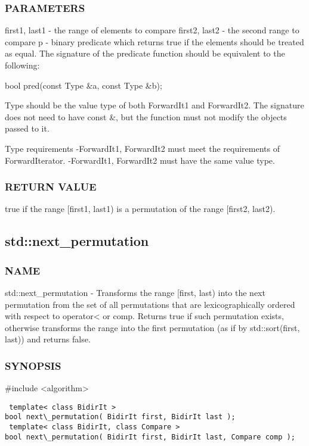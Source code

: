 \subsubsection{PARAMETERS}
first1, last1 - the range of elements to compare
first2, last2 - the second range to compare
p - binary predicate which returns true if the elements should be treated as equal.
The signature of the predicate function should be equivalent to the following:

 bool pred(const Type \&a, const Type \&b);

Type should be the value type of both ForwardIt1 and ForwardIt2. The signature does not need to have const \&, but the function must not modify the objects passed to it.

 Type requirements
 -ForwardIt1, ForwardIt2 must meet the requirements of ForwardIterator.
 -ForwardIt1, ForwardIt2 must have the same value type.

\subsubsection{RETURN VALUE}
true if the range [first1, last1) is a permutation of the range [first2, last2).



\subsection{std::next\_permutation}

\subsubsection{NAME}
std::next\_permutation - Transforms the range [first, last) into the next permutation from the set of all permutations that are lexicographically ordered with respect to operator< or comp. Returns true if such permutation exists, otherwise transforms the range into the first permutation (as if by std::sort(first, last)) and returns false.

\subsubsection{SYNOPSIS}
\#include <algorithm>

\begin{lstlisting}
 template< class BidirIt >
bool next\_permutation( BidirIt first, BidirIt last );
 template< class BidirIt, class Compare >
bool next\_permutation( BidirIt first, BidirIt last, Compare comp );
\end{lstlisting}

